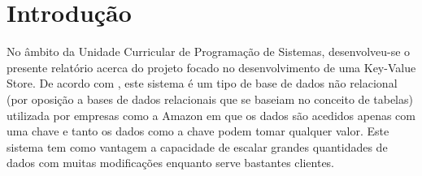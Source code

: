 










\section{Introdução}


No âmbito da Unidade Curricular de Programação de Sistemas, desenvolveu-se o presente relatório acerca do projeto focado no desenvolvimento de uma Key-Value Store. De acordo com \cite{amazon}, este sistema é um tipo de base de dados não relacional (por oposição a bases de dados relacionais que se baseiam no conceito de tabelas) utilizada por empresas como a Amazon em que os dados são acedidos apenas com uma chave e tanto os dados como a chave podem tomar qualquer valor. Este sistema tem como vantagem a capacidade de escalar grandes quantidades de dados com muitas modificações enquanto serve bastantes clientes.

